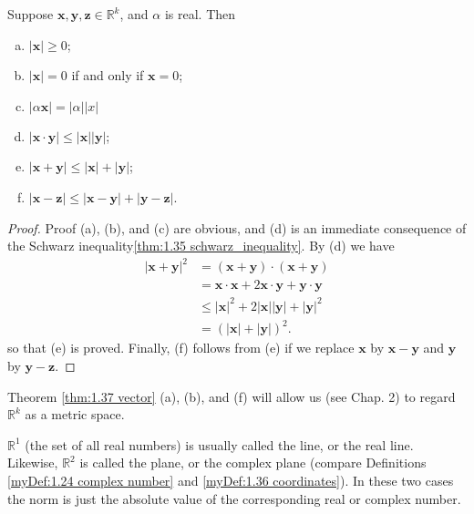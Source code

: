 \begin{thm}\label{thm:1.37 vector}
    Suppose $\mathbf{x}, \mathbf{y}, \mathbf{z}\in\mathbb{R}^k$, and $\alpha$ is real. Then
    \begin{enumerate}[(a)]
        \item $| \mathbf{x}| \geq 0$;
        \item $| \mathbf{x}| = 0$ if and only if $\mathbf{x} =0$;
        \item $| \alpha \mathbf{x}| = | \alpha||x|$
        \item $|\mathbf{x}\cdot\mathbf{y}| \leq  |\mathbf{x}| | \mathbf{y}|$;
        \item $|\mathbf{x}+\mathbf{y}| \leq | \mathbf{x} | + | \mathbf{y}|$;
        \item $|\mathbf{x}-\mathbf{z}| \leq |\mathbf{x}-\mathbf{y}| + |\mathbf{y}-\mathbf{z}|$.
    \end{enumerate}
\end{thm}


\begin{proof}
    Proof (a), (b), and (c) are obvious, and (d) is an immediate consequence of the Schwarz inequality\ref{thm:1.35 schwarz_inequality}. By (d) we have 
    \begin{align*}
        |\mathbf{x} + \mathbf{y}|^2
        &= (\mathbf{x} + \mathbf{y}) \cdot (\mathbf{x} + \mathbf{y})\\
        &= \mathbf{x} \cdot \mathbf{x} + 2\mathbf{x} \cdot \mathbf{y} + \mathbf{y} \cdot \mathbf{y}\\
        &\leq |\mathbf{x}|^2 + 2|\mathbf{x}||\mathbf{y}| + |\mathbf{y}|^2\\
        &= \left(|\mathbf{x}| + |\mathbf{y}|\right)^2.
    \end{align*}
    so that (e) is proved. Finally, 
    (f) follows from (e) if we 
    replace $\mathbf{x}$ by $\mathbf{x}-\mathbf{y}$ 
    and $\mathbf{y}$ by $\mathbf{y}-\mathbf{z}$.
\end{proof}

\begin{myRemark}\label{myRemark:1.38}
    Theorem \ref{thm:1.37 vector} (a), (b), and (f) will allow us (see Chap. 2) to
    regard $\mathbb{R}^k$ as a metric space.
    
    $\mathbb{R}^1$ (the set of all real numbers) is usually called the line, or the real line. Likewise, $\mathbb{R}^2$ is called the plane, or the complex plane (compare Definitions \ref{myDef:1.24 complex number} and \ref{myDef:1.36 coordinates}). In these two cases the norm is just the absolute value of the corresponding real or complex number. 
\end{myRemark}
